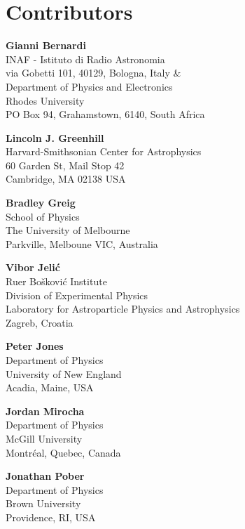 
\chapter*{Contributors}



{\parskip=12pt

\noindent\textbf{Gianni Bernardi}\\
INAF - Istituto di Radio Astronomia\\
via Gobetti 101, 40129, Bologna, Italy \& \\
Department of Physics and Electronics\\
Rhodes University\\
PO Box 94, Grahamstown, 6140, South Africa

\noindent\textbf{Lincoln J. Greenhill}\\
Harvard-Smithsonian Center for Astrophysics\\
60 Garden St, Mail Stop 42\\
Cambridge, MA 02138 USA

\noindent\textbf{Bradley Greig}\\
School of Physics\\
The University of Melbourne\\
Parkville, Melboune VIC, Australia

\noindent\textbf{Vibor Jeli\'c}\\
Ru{\dj}er Bo\v{s}kovi\'{c} Institute\\
Division of Experimental Physics\\
Laboratory for Astroparticle Physics and Astrophysics\\
Zagreb, Croatia

\noindent\textbf{Peter Jones}\\
Department of Physics\\
University of New England\\
Acadia, Maine, USA

\noindent\textbf{Jordan Mirocha}\\
Department of Physics\\
McGill University \\
Montr\'eal, Quebec, Canada

\noindent\textbf{Jonathan Pober}\\
Department of Physics\\
Brown University\\
Providence, RI, USA

}

